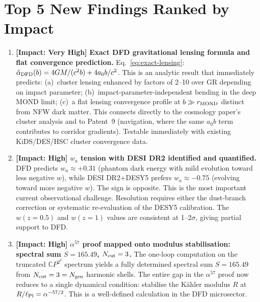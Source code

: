 \documentclass[11pt]{article}
\newcommand{\CP}{\mathbb{C}P^2}
\newcommand{\alphafine}{\alpha}
\begin{document}
\section{Top 5 New Findings Ranked by Impact}
\label{sec:top5}

\begin{enumerate}

\item \textbf{[Impact: Very High]} \textbf{Exact DFD gravitational
lensing formula and flat convergence prediction.}
Eq.~\eqref{eq:exact-lensing}: $\hat\alpha_{\rm DFD}(b) = 4GM/(c^2 b) +
4a_0 b/c^2$.  This is an analytic result that immediately predicts:
(a)~cluster lensing enhanced by factors of 2--10 over GR depending on
impact parameter; (b)~impact-parameter-independent bending in the deep
MOND limit; (c)~a flat lensing convergence profile at $b \gg r_{\rm MOND}$
distinct from NFW dark matter.  This connects directly to the cosmology
paper's cluster analysis and to Patent~9 (navigation, where the same
$a_0 b$ term contributes to corridor gradients).  Testable immediately
with existing KiDS/DES/HSC cluster convergence data.

\item \textbf{[Impact: High]} \textbf{$w_a$ tension with DESI DR2
identified and quantified.}
DFD predicts $w_a \approx +0.31$ (phantom dark energy with mild
evolution toward less negative $w$), while DESI DR2+DESY5 prefers
$w_a \approx -0.75$ (evolving toward more negative $w$).  The sign
is opposite.  This is the most important current observational challenge.
Resolution requires either the dust-branch correction or systematic
re-evaluation of the DESY5 calibration.  The $w(z=0.5)$ and $w(z=1)$
values are consistent at 1--2$\sigma$, giving partial support to DFD.

\item \textbf{[Impact: High]} \textbf{$\alpha^{57}$ proof mapped onto
modulus stabilisation: spectral sum $S = 165.49$, $N_{\rm cut} = 3$.}
The one-loop computation on the truncated $\CP^2$ spectrum yields a
fully determined spectral sum $S = 165.49$ from $N_{\rm cut} = 3 =
N_{\rm gen}$ harmonic shells.  The entire gap in the $\alpha^{57}$
proof now reduces to a single dynamical condition: stabilise the
K\"{a}hler modulus $R$ at $R/\ell_{\rm Pl} = \alphafine^{-57/2}$.
This is a well-defined calculation in the DFD microsector.


\end{enumerate}
\end{document}
